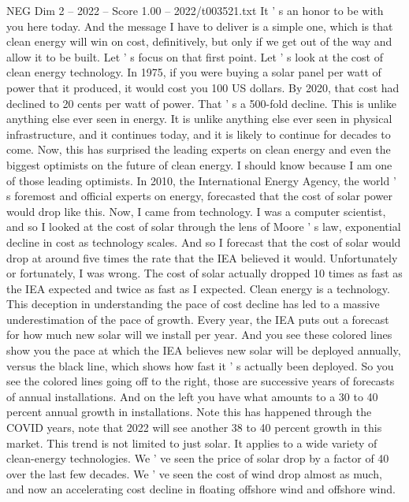 \begin{textsample}{NEG Dim 2 – 2022 – Score 1.00 – 2022/t003521.txt}  \label{ex:f2_neg_066}
It ' s an honor to be with you here today.
And the message I have to deliver is a simple one, which is that clean energy will win on cost, definitively, but only if we get out of the way and allow it to be built.
Let ' s focus on that first point.
Let ' s look at the cost of clean energy technology.
In 1975, if you were buying a solar panel per watt of power that it produced, it would cost you 100 US dollars.
By 2020, that cost had declined to 20 cents per watt of power.
That ' s a 500-fold decline.
This is unlike anything else ever seen in energy.
It is unlike anything else ever seen in physical infrastructure, and it continues today, and it is likely to continue for decades to come.
Now, this has surprised the leading experts on clean energy and even the biggest optimists on the future of clean energy.
I should know because I am one of those leading optimists.
In 2010, the International Energy Agency, the world ' s foremost and official experts on energy, forecasted that the cost of solar power would drop like this.
Now, I came from technology.
I was a computer scientist, and so I looked at the cost of solar through the lens of Moore ' s law, exponential decline in cost as technology scales.
And so I forecast that the cost of solar would drop at around five times the rate that the IEA believed it would.
Unfortunately or fortunately, I was wrong.
The cost of solar actually dropped 10 times as fast as the IEA expected and twice as fast as I expected.
Clean energy is a technology.
This deception in understanding the pace of cost decline has led to a massive underestimation of the pace of growth.
Every year, the IEA puts out a forecast for how much new solar will we install per year.
And you see these colored lines show you the pace at which the IEA believes new solar will be deployed annually, versus the black line, which shows how fast it ' s actually been deployed.
So you see the colored lines going off to the right, those are successive years of forecasts of annual installations.
And on the left you have what amounts to a 30 to 40 percent annual growth in installations.
Note this has happened through the COVID years, note that 2022 will see another 38 to 40 percent growth in this market.
This trend is not limited to just solar.
It applies to a wide variety of clean-energy technologies.
We ' ve seen the price of solar drop by a factor of 40 over the last few decades.
We ' ve seen the cost of wind drop almost as much, and now an accelerating cost decline in floating offshore wind and offshore wind.

\end{textsample}
